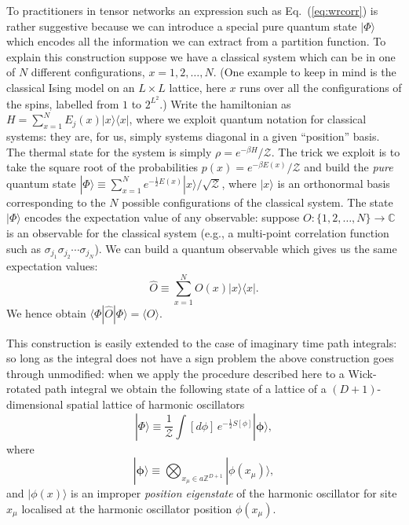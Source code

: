 \documentclass[twocolumn,lengthcheck,superscriptaddress]{revtex4-1}
\theoremstyle{definition}
\theoremstyle{remark}
\begin{document}
To practitioners in tensor networks an expression such as Eq.~(\ref{eq:wrcorr}) is rather suggestive because we can introduce a special pure quantum state $|\Phi\rangle$ which encodes all the information we can extract from a partition function. To explain this construction suppose we have a classical system which can be in one of $N$ different configurations, $x = 1, 2, \ldots, N$. (One example to keep in mind is the classical Ising model on an $L\times L$ lattice, here $x$ runs over all the configurations of the spins, labelled from $1$ to $2^{L^2}$.) Write the hamiltonian as $H = \sum_{x=1}^N E_j(x) |x\rangle\langle x|$, where we exploit quantum notation for classical systems: they are, for us, simply systems diagonal in a given ``position'' basis. The thermal state for the system is simply $\rho = e^{-\beta H}/\mathcal{Z}$. The trick we exploit is to take the square root of the probabilities $p(x) = e^{-\beta E(x)}/\mathcal{Z}$ \cite{rudolph:2002a, aharonov:2003a} and build the \emph{pure} quantum state $|\Phi\rangle \equiv \sum_{x=1}^N e^{-\frac12E(x)}|x\rangle/\sqrt{\mathcal{Z}}$, where $|x\rangle$ is an orthonormal basis corresponding to the $N$ possible configurations of the classical system. The state $|\Phi\rangle$ encodes the expectation value of any observable: suppose $O:\{1,2,\ldots, N\}\rightarrow \mathbb{C}$ is an observable for the classical system (e.g., a multi-point correlation function such as $\sigma_{j_1}\sigma_{j_2}\cdots \sigma_{j_N}$). We can build a quantum observable which gives us the same expectation values:
\begin{equation}
	\widehat{O} \equiv \sum_{x=1}^N O(x) |x\rangle\langle x|.
\end{equation}
We hence obtain $\langle \Phi|\widehat{O}|\Phi\rangle = \langle O\rangle$. 

This construction is easily extended to the case of imaginary time path integrals: so long as the integral does not have a sign problem the above construction goes through unmodified: when we apply the procedure described here to a Wick-rotated path integral we obtain the following state of a lattice of a $(D+1)$-dimensional spatial lattice of harmonic oscillators 
\begin{equation}
	|\Phi\rangle \equiv \frac{1}{\mathcal{Z}}\int [d\phi] \,e^{-\frac{1}{2}S[\phi]}  |\boldsymbol{\phi}\rangle,
\end{equation}
where
\begin{equation}
	|\boldsymbol{\phi}\rangle \equiv \bigotimes_{x_\mu\in a\mathbb{Z}^{D+1}} |\phi(x_\mu)\rangle,
\end{equation}
and $|\phi(x)\rangle$ is an improper \emph{position eigenstate} of the harmonic oscillator for site $x_\mu$ localised at the harmonic oscillator position $\phi(x_\mu)$.
\end{document}
